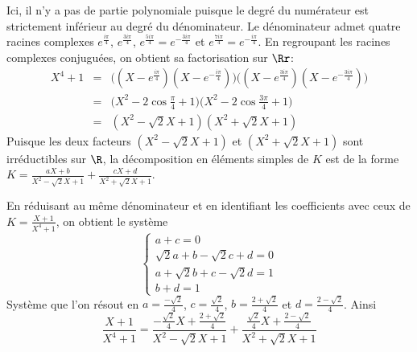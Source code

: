 {\begin{enumerate}
{Ici, il n'y a pas de partie polynomiale puisque le degré du numérateur 
est strictement inférieur au degré du dénominateur. 
Le dénominateur admet quatre racines complexes 
$e^{\frac{i\pi}{4}}$, $e^{\frac{3i\pi}{4}}$, $e^{\frac{5i\pi}{4}}=e^{-\frac{3i\pi}{4}}$ et 
$e^{\frac{7i\pi}{4}}=e^{-\frac{i\pi}{4}}$. 
En regroupant les racines complexes conjuguées, on obtient sa factorisation sur $\Rr$:
\begin{eqnarray*}
X^4+1 &=& \big( (X-e^{\frac{i\pi}{4}})(X-e^{-\frac{i\pi}{4}}) \big)\big( (X-e^{\frac{3i\pi}{4}})(X-e^{-\frac{3i\pi}{4}}) \big) \\
      &=&\big(X^2-2\cos\tfrac{\pi}{4}+1\big)\big(X^2-2\cos\tfrac{3\pi}{4}+1\big)\\
      &=&(X^2-\sqrt{2}X+1)(X^2+\sqrt{2}X+1)
\end{eqnarray*}
Puisque les deux facteurs $(X^2-\sqrt{2}X+1)$ et $(X^2+\sqrt{2}X+1)$ sont irréductibles sur $\R$, la décomposition en éléments simples de $K$ est de la forme
$K=\frac{aX+b}{X^2-\sqrt{2}X+1}+\frac{cX+d}{X^2+\sqrt{2}X+1}$.

En réduisant au même dénominateur et en identifiant les coefficients avec ceux de $K=\frac{X+1}{X^4+1}$, 
on obtient le système
$$\left\{\begin{array}{l}
a+c=0\\
\sqrt{2}a+b-\sqrt{2}c+d=0\\
a+\sqrt{2}b+c-\sqrt{2}d=1\\
b+d=1
\end{array}\right.$$
Système que l'on résout en $a=\frac{-\sqrt{2}}{4}$, $c=\frac{\sqrt{2}}{4}$, $b=\frac{2+\sqrt{2}}{4}$ et $d=\frac{2-\sqrt{2}}{4}$. Ainsi
$$\frac{X+1}{X^4+1} = \frac{-\frac{\sqrt{2}}{4}X+\frac{2+\sqrt{2}}{4}}{X^2-\sqrt{2}X+1} + \frac{\frac{\sqrt{2}}{4}X+\frac{2-\sqrt{2}}{4}}{X^2+\sqrt{2}X+1}$$}
\end{enumerate}
}